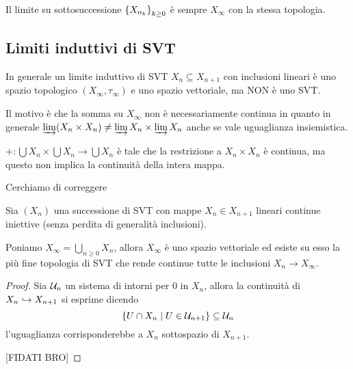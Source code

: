 \begin{remark}
Il limite su sottosuccessione $\left\{{X_{n_k}}\right\}_{k\geq 0}$ \`e sempre $X_{\infty}$ con la stessa topologia.
\end{remark}

\subsection{Limiti induttivi di SVT}
\begin{remark}
In generale un limite induttivo di SVT $X_n\subseteq X_{n+1}$ con inclusioni lineari \`e uno spazio topologico $(X_\infty,\tau_\infty)$ e uno spazio vettoriale, ma NON \`e uno SVT.

Il motivo \`e che la somma su $X_\infty$ non \`e necessariamente continua in quanto in generale $\varinjlim (X_n\times X_n)\neq \varinjlim X_n\times\varinjlim X_n$ anche se vale uguaglianza insiemistica.

$+:\bigcup X_n\times \bigcup X_n\to \bigcup X_n$ \`e tale che la restrizione a $X_n\times X_n$ \`e continua, ma questo non implica la continuit\`a della intera mappa.
\end{remark}

Cerchiamo di correggere

\begin{proposition}\label{PrLimiteInduttivoDiSVT}
Sia $(X_n)$ una successione di SVT con mappe $X_n\in X_{n+1}$ lineari continue iniettive (senza perdita di generalit\`a inclusioni). 

Poniamo $X_\infty=\bigcup_{n\geq 0}X_n$, allora $X_\infty$ \`e uno spazio vettoriale ed esiste su esso la pi\`u fine topologia di SVT che rende continue tutte le inclusioni $X_n\to X_\infty$.
\end{proposition}
\begin{proof}
Sia $\mathcal{U}_n$ un sistema di intorni per $0$ in $X_n$, allora la continuit\`a di $X_n\hookrightarrow X_{n+1}$ si esprime dicendo
\[\left\{{U\cap X_n\mid U\in \mathcal{U}_{n+1}}\right\}\subseteq \mathcal{U}_{n}\]
l'uguaglianza corrisponderebbe a $X_n$ sottospazio di $X_{n+1}$.


[FIDATI BRO]
\end{proof}

